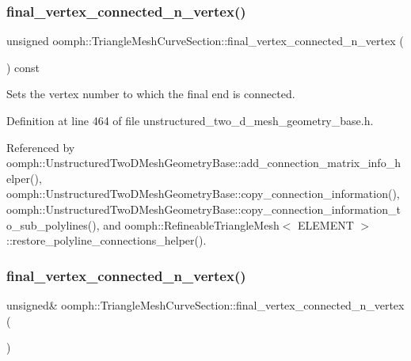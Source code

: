 \subsubsection{\texorpdfstring{final\+\_\+vertex\+\_\+connected\+\_\+n\+\_\+vertex()}{final\_vertex\_connected\_n\_vertex()}\hspace{0.1cm}{\footnotesize\ttfamily [1/2]}}
{\footnotesize\ttfamily unsigned oomph\+::\+Triangle\+Mesh\+Curve\+Section\+::final\+\_\+vertex\+\_\+connected\+\_\+n\+\_\+vertex (\begin{DoxyParamCaption}{ }\end{DoxyParamCaption}) const\hspace{0.3cm}{\ttfamily [inline]}}



Sets the vertex number to which the final end is connected. 



Definition at line 464 of file unstructured\+\_\+two\+\_\+d\+\_\+mesh\+\_\+geometry\+\_\+base.\+h.



Referenced by oomph\+::\+Unstructured\+Two\+D\+Mesh\+Geometry\+Base\+::add\+\_\+connection\+\_\+matrix\+\_\+info\+\_\+helper(), oomph\+::\+Unstructured\+Two\+D\+Mesh\+Geometry\+Base\+::copy\+\_\+connection\+\_\+information(), oomph\+::\+Unstructured\+Two\+D\+Mesh\+Geometry\+Base\+::copy\+\_\+connection\+\_\+information\+\_\+to\+\_\+sub\+\_\+polylines(), and oomph\+::\+Refineable\+Triangle\+Mesh$<$ E\+L\+E\+M\+E\+N\+T $>$\+::restore\+\_\+polyline\+\_\+connections\+\_\+helper().

\mbox{\label{classoomph_1_1TriangleMeshCurveSection_a29571c3c921d5bd8118d9e0b15f4a6e3}} 
\subsubsection{\texorpdfstring{final\+\_\+vertex\+\_\+connected\+\_\+n\+\_\+vertex()}{final\_vertex\_connected\_n\_vertex()}\hspace{0.1cm}{\footnotesize\ttfamily [2/2]}}
{\footnotesize\ttfamily unsigned\& oomph\+::\+Triangle\+Mesh\+Curve\+Section\+::final\+\_\+vertex\+\_\+connected\+\_\+n\+\_\+vertex (\begin{DoxyParamCaption}{ }\end{DoxyParamCaption})\hspace{0.3cm}{\ttfamily [inline]}}



